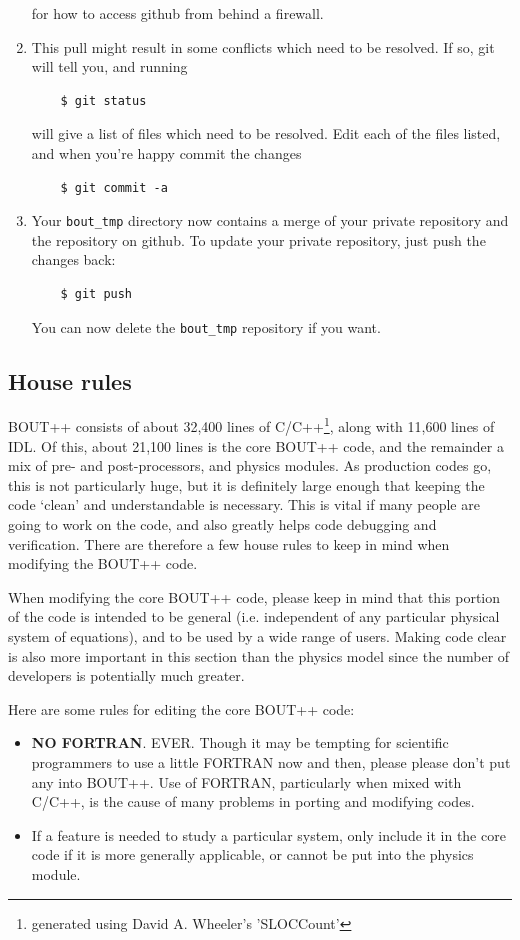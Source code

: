 \documentclass[12pt]{article}
\begin{document}
\begin{enumerate}
  for how to access github from behind a firewall.
\item
  This pull might result in some conflicts which need to be resolved. If so, git will
  tell you, and running
  \begin{verbatim}
    $ git status
  \end{verbatim}
  will give a list of files which need to be resolved. Edit each of the files listed, and when you're happy 
  commit the changes
  \begin{verbatim}
    $ git commit -a
  \end{verbatim}
\item Your \texttt{bout\_tmp} directory now contains a merge of your private repository and the repository
  on github. To update your private repository, just push the changes back:
  \begin{verbatim}
    $ git push
  \end{verbatim}
  You can now delete the \texttt{bout\_tmp} repository if you want.
\end{enumerate}


\subsection{House rules}

BOUT++ consists of about 32,400 lines of C/C++\footnote{generated using
David A. Wheeler's 'SLOCCount'},
along with 11,600 lines of IDL. Of this, about 21,100 lines is the core
BOUT++ code, and the remainder
a mix of pre- and post-processors, and physics modules. As production codes
go, this is not particularly huge, but it is definitely large enough that
keeping the code `clean' and understandable is necessary. This is vital
if many people are going to work on the code, and also greatly helps code
debugging and verification. There are therefore a few house rules to keep
in mind when modifying the BOUT++ code.

When modifying the core BOUT++ code, please keep in mind that this portion of the code
is intended to be general (i.e. independent of any particular physical system of equations),
and to be used by a wide range of users. Making code clear is also more important
in this section than the physics model since the number of developers is potentially
much greater. 

Here are some rules for editing the core BOUT++ code:
\begin{itemize}
\item {} {\bf NO FORTRAN}. EVER. Though it may be tempting for scientific programmers to use
a little FORTRAN now and then, please please don't put any into BOUT++. 
Use of FORTRAN, particularly when mixed with C/C++, is the cause of many problems in
porting and modifying codes. 
\item If a feature is needed to study a particular system, only include it in the
core code if it is more generally applicable, or cannot be put into the physics module.
\end{itemize}
\end{document}
